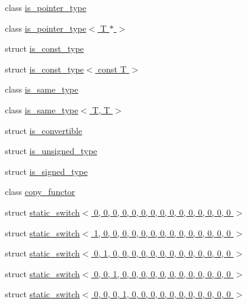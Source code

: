 \begin{DoxyCompactItemize}
\item 
class \hyperlink{classdlib_1_1is__pointer__type}{is\_\-pointer\_\-type}
\item 
class \hyperlink{classdlib_1_1is__pointer__type_3_01T_01_5_01_4}{is\_\-pointer\_\-type$<$ T $\ast$ $>$}
\item 
struct \hyperlink{structdlib_1_1is__const__type}{is\_\-const\_\-type}
\item 
struct \hyperlink{structdlib_1_1is__const__type_3_01const_01T_01_4}{is\_\-const\_\-type$<$ const T $>$}
\item 
class \hyperlink{classdlib_1_1is__same__type}{is\_\-same\_\-type}
\item 
class \hyperlink{classdlib_1_1is__same__type_3_01T_00_01T_01_4}{is\_\-same\_\-type$<$ T, T $>$}
\item 
struct \hyperlink{structdlib_1_1is__convertible}{is\_\-convertible}
\item 
struct \hyperlink{structdlib_1_1is__unsigned__type}{is\_\-unsigned\_\-type}
\item 
struct \hyperlink{structdlib_1_1is__signed__type}{is\_\-signed\_\-type}
\item 
class \hyperlink{classdlib_1_1copy__functor}{copy\_\-functor}
\item 
struct \hyperlink{structdlib_1_1static__switch_3_010_00_010_00_010_00_010_00_010_00_010_00_010_00_010_00_010_00_01297db704ac0ccd7cdf569f49ff1837f4}{static\_\-switch$<$ 0, 0, 0, 0, 0, 0, 0, 0, 0, 0, 0, 0, 0, 0, 0 $>$}
\item 
struct \hyperlink{structdlib_1_1static__switch_3_011_00_010_00_010_00_010_00_010_00_010_00_010_00_010_00_010_00_01e6d4ee9dd0db82c25ad3e5e162ffcf57}{static\_\-switch$<$ 1, 0, 0, 0, 0, 0, 0, 0, 0, 0, 0, 0, 0, 0, 0 $>$}
\item 
struct \hyperlink{structdlib_1_1static__switch_3_010_00_011_00_010_00_010_00_010_00_010_00_010_00_010_00_010_00_013c4ac657bc48737c62a5b545ecf666e2}{static\_\-switch$<$ 0, 1, 0, 0, 0, 0, 0, 0, 0, 0, 0, 0, 0, 0, 0 $>$}
\item 
struct \hyperlink{structdlib_1_1static__switch_3_010_00_010_00_011_00_010_00_010_00_010_00_010_00_010_00_010_00_01f20039fe97478cfcdfb8a6fb10d88c23}{static\_\-switch$<$ 0, 0, 1, 0, 0, 0, 0, 0, 0, 0, 0, 0, 0, 0, 0 $>$}
\item 
struct \hyperlink{structdlib_1_1static__switch_3_010_00_010_00_010_00_011_00_010_00_010_00_010_00_010_00_010_00_017e7e1ea6f90a3743d68a10bc9ac43767}{static\_\-switch$<$ 0, 0, 0, 1, 0, 0, 0, 0, 0, 0, 0, 0, 0, 0, 0 $>$}

\end{DoxyCompactItemize}
